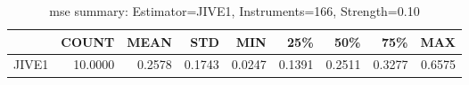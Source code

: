 \begin{table}[ht]
\centering
\caption{mse summary: Estimator=JIVE1, Instruments=166, Strength=0.10}
\begin{tabular}{lrrrrrrrr}
\toprule
 & COUNT & MEAN & STD & MIN & 25\% & 50\% & 75\% & MAX \\
\midrule
JIVE1 & 10.0000 & 0.2578 & 0.1743 & 0.0247 & 0.1391 & 0.2511 & 0.3277 & 0.6575 \\
\bottomrule
\end{tabular}
\end{table}

